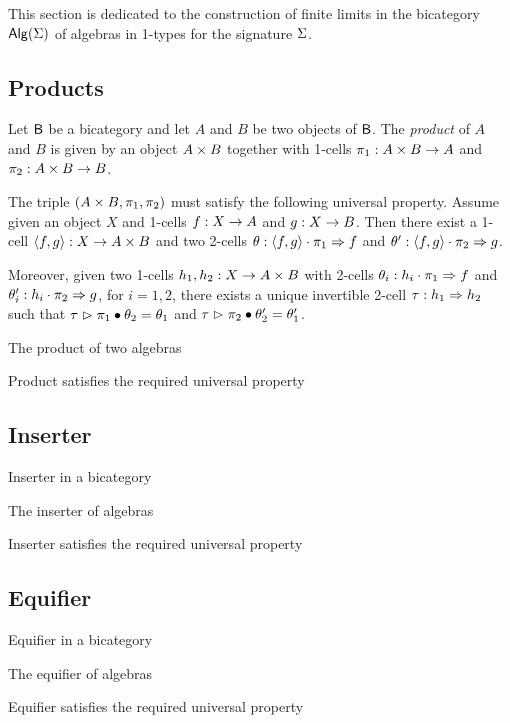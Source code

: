 This section is dedicated to the construction of finite limits in the
bicategory $\mathsf{Alg}(\Sigma)$ of algebras in 1-types for the signature $\Sigma$.

\subsection{Products}

\begin{definition}
Let $\mathsf{B}$ be a bicategory and let $A$ and $B$ be two objects of
$\mathsf{B}$. The \emph{product} of $A$ and $B$ is given by an object $A \times B$ together with 1-cells $\pi_1 : A \times B \rightarrow A$ and
$\pi_2 : A \times B \rightarrow B$.

The triple $(A \times B,\pi_1, \pi_2)$ must satisfy the following
universal property. Assume given an object $X$ and 1-cells $f : X
\rightarrow A$ and $g : X \rightarrow B$. Then there exist a 1-cell
$\langle f , g \rangle : X \rightarrow A \times B$ and two 2-cells $\theta :
\langle f , g \rangle \cdot \pi_1 \Rightarrow f$ and $\theta' : \langle f , g \rangle
\cdot \pi_2 \Rightarrow g$.


Moreover, given two 1-cells $h_1,h_2 : X \rightarrow A \times B$ with
2-cells $\theta_i : h_i \cdot \pi_1 \Rightarrow f$ and $\theta'_i : h_i
\cdot \pi_2 \Rightarrow g$, for $i= 1,2$, there exists a unique
invertible 2-cell $\tau : h_1 \Rightarrow h_2$ such that $\tau \vartriangleright
\pi_1 \bullet \theta_2 = \theta_1$ and $\tau \vartriangleright \pi_2 \bullet
\theta'_2 = \theta'_1$.
\end{definition} 

\begin{definition}
The product of two algebras
\end{definition}

\begin{proposition}
Product satisfies the required universal property
\end{proposition}

\subsection{Inserter}

\begin{definition}
Inserter in a bicategory
\end{definition}

\begin{definition}
The inserter of algebras
\end{definition}

\begin{proposition}
Inserter satisfies the required universal property
\end{proposition}

\subsection{Equifier}

\begin{definition}
Equifier in a bicategory
\end{definition}

\begin{definition}
The equifier of algebras
\end{definition}

\begin{proposition}
Equifier satisfies the required universal property
\end{proposition}
